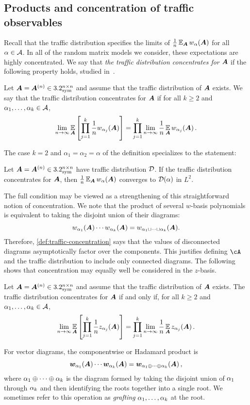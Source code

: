 \subsection{Products and concentration of traffic observables}

Recall that the traffic distribution specifies the limits of $\frac 1n \operatorname*{\mathbb{E}}_{\bm A} w_\alpha({\bm A})$
for all $\alpha \in {\cal A}$.
In all of the random matrix models we consider,
these expectations are highly concentrated.
We say that {\em the traffic distribution concentrates for ${\bm A}$} if the
following property holds, studied in~\cite{male2020traffic}.

\begin{definition}\label{def:traffic-concentration}
    Let ${\bm A} = {\bm A}^{(n)} \in 3.2^{n \times n}_{\mathrm{sym}}$ and assume that the traffic distribution of ${\bm A}$ exists. We say that the traffic distribution concentrates for ${\bm A}$
    if for all $k \geq 2$ and $\alpha_1, \dots, \alpha_k \in {\cal A}$,
    \[
        \lim_{n \to \infty} \operatorname*{\mathbb{E}}_{{\bm A}} \left[ \prod_{j=1}^k \frac 1n w_{\alpha_j}({\bm A})\right] = \prod_{j=1}^k \lim_{n \to \infty} \frac 1n \operatorname*{\mathbb{E}}_{{\bm A}} w_{\alpha_j}({\bm A})\,.
    \]
\end{definition}
\noindent
The case $k = 2$ and $\alpha_1 = \alpha_2 = \alpha$ of the definition specializes to the statement:
\begin{lemma}\label{lem:traffic-l2}
    Let ${\bm A} = {\bm A}^{(n)} \in 3.2^{n \times n}_{\mathrm{sym}}$ have traffic distribution ${\cal D}$. 
    If the traffic distribution concentrates for ${\bm A}$, then $\frac 1n \operatorname*{\mathbb{E}}_{{\bm A}} w_\alpha({\bm A})$ converges to ${\cal D}(\alpha)$ in $L^2$.
\end{lemma}
The full condition may be viewed as a strengthening of this straightforward notion of concentration.
We note that the product of several $w$-basis polynomials is equivalent to taking the disjoint union of their diagrams:
\[ w_{\alpha_1}({\bm A}) \cdots w_{\alpha_k}({\bm A}) = w_{\alpha_1 \sqcup \cdots \sqcup \alpha_k}({\bm A}).\]
Therefore, \cref{def:traffic-concentration} says that the values of disconnected diagrams asymptotically factor over the components.
This justifies defining
$\cA$ and the traffic distribution to include only connected diagrams.
The following shows that concentration may equally well be considered in the $z$-basis.

\begin{lemma} \label{lem:concentration-z}
    Let ${\bm A} = {\bm A}^{(n)} \in 3.2^{n \times n}_{\mathrm{sym}}$ and assume that the traffic distribution of ${\bm A}$ exists. The traffic distribution concentrates for ${\bm A}$ if and only if, for all $k \geq 2$ and $\alpha_1, \dots, \alpha_k \in {\cal A}$,
    \[
        \lim_{n \to \infty} \operatorname*{\mathbb{E}}_{{\bm A}} \left[ \prod_{j=1}^k \frac 1n z_{\alpha_j}({\bm A})\right] = \prod_{j=1}^k \lim_{n \to \infty} \frac 1n \operatorname*{\mathbb{E}}_{{\bm A}} z_{\alpha_j}({\bm A})\,.
    \]
\end{lemma}


For vector diagrams, the componentwise or Hadamard product is
\[
    {\bm w}_{\alpha_1}({\bm A}) \cdots {\bm w}_{\alpha_k}({\bm A}) = {\bm w}_{\alpha_1 \oplus \cdots \oplus \alpha_k}({\bm A})\,,
\]
where $\alpha_1 \oplus \cdots \oplus \alpha_k$ is the diagram formed by taking the disjoint union of $\alpha_1$ through $\alpha_k$ and then identifying the roots together into a single root.
We sometimes refer to this operation as \emph{grafting} $\alpha_1, \dots, \alpha_k$ at the root.